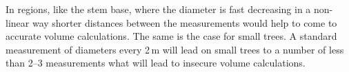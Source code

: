 \documentclass[twocolumn]{scrartcl}
\begin{document}
In regions, like the stem base, where the diameter is fast decreasing in a
non-linear way shorter distances between the measurements would help to come to
accurate volume calculations. The same is the case for small trees. A standard
measurement of diameters every 2\,m will lead on small trees to a number of less
than 2--3 measurements what will lead to insecure volume calculations.





\end{document}
